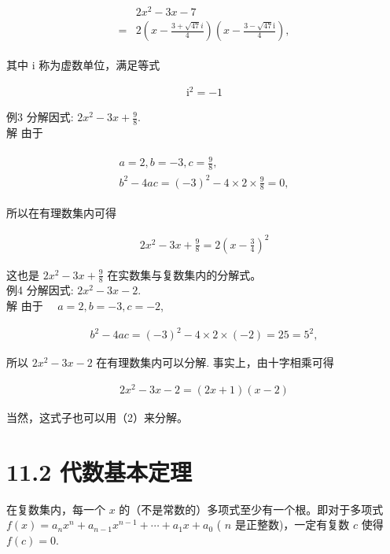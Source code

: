\documentclass[10pt]{article}
\begin{document}
\begin{align*}
\begin{aligned}
& 2 x^{2}-3 x-7 \\
= & 2\left(x-\frac{3+\sqrt{47} i}{4}\right)\left(x-\frac{3-\sqrt{47} \mathrm{i}}{4}\right),
\end{aligned}
\end{align*}

其中 i 称为虚数单位，满足等式

\begin{align*}
\mathrm{i}^{2}=-1
\end{align*}

例3 分解因式: $2 x^{2}-3 x+\frac{9}{8}$.\\
解 由于

\begin{align*}
\begin{gathered}
a=2, b=-3, c=\frac{9}{8}, \\
b^{2}-4 a c=(-3)^{2}-4 \times 2 \times \frac{9}{8}=0,
\end{gathered}
\end{align*}

所以在有理数集内可得

\begin{align*}
2 x^{2}-3 x+\frac{9}{8}=2\left(x-\frac{3}{4}\right)^{2}
\end{align*}

这也是 $2 x^{2}-3 x+\frac{9}{8}$ 在实数集与复数集内的分解式。\\
例4 分解因式: $2 x^{2}-3 x-2$.\\
解 由于 $\quad a=2, b=-3, c=-2$,

\begin{align*}
b^{2}-4 a c=(-3)^{2}-4 \times 2 \times(-2)=25=5^{2},
\end{align*}

所以 $2 x^{2}-3 x-2$ 在有理数集内可以分解. 事实上，由十字相乘可得

\begin{align*}
2 x^{2}-3 x-2=(2 x+1)(x-2)
\end{align*}

当然，这式子也可以用（2）来分解。

\section*{11.2 代数基本定理}
在复数集内，每一个 $x$ 的（不是常数的）多项式至少有一个根。即对于多项式 $f(x)=a_{n} x^{n}+a_{n-1} x^{n-1}+\cdots+a_{1} x+a_{0}$ ( $n$ 是正整数)，一定有复数 $c$ 使得 $f(c)=0$.
\end{document}
